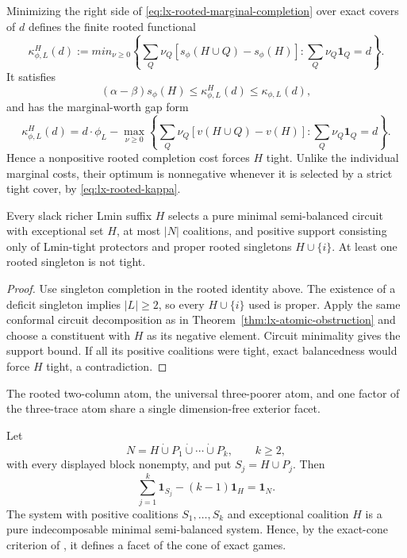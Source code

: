 Minimizing the right side of
\eqref{eq:lx-rooted-marginal-completion} over exact covers of $d$ defines the
finite rooted functional
\[
 \kappa^H_{\phi,L}(d):=min_{\nu\geq0}
 \left\{\sum_Q\nu_Q[s_\phi(H\cup Q)-s_\phi(H)]:
              \sum_Q\nu_Q\mathbf1_Q=d\right\}.
\]
It satisfies
\[
 (\alpha-\beta)s_\phi(H)\leq\kappa^H_{\phi,L}(d)
 \leq\kappa_{\phi,L}(d),                            \tag{RK}
 \label{eq:lx-rooted-kappa}
\]
and has the marginal-worth gap form
\[
 \kappa^H_{\phi,L}(d)=d\mathbin{\cdot}\phi_L-
 \max_{\nu\geq0}\left\{
   \sum_Q\nu_Q[v(H\cup Q)-v(H)]:
   \sum_Q\nu_Q\mathbf1_Q=d\right\}.               \tag{RG}
 \label{eq:lx-rooted-gap}
\]
Hence a nonpositive rooted completion cost forces $H$ tight.  Unlike the
individual marginal costs, their optimum is nonnegative whenever it is
selected by a strict tight cover, by \eqref{eq:lx-rooted-kappa}.

\begin{corollary}
\label{cor:lx-rooted-atomic-reduction}
Every slack richer Lmin suffix $H$ selects a pure minimal semi-balanced
circuit with exceptional set $H$, at most $|N|$ coalitions, and positive
support consisting only of Lmin-tight protectors and proper rooted
singletons $H\cup\{i\}$.  At least one rooted singleton is not tight.
\end{corollary}

\begin{proof}
Use singleton completion in the rooted identity above.  The existence of a
deficit singleton implies $|L|\geq2$, so every $H\cup\{i\}$ used is proper.
Apply the same conformal circuit decomposition as in
Theorem~\ref{thm:lx-atomic-obstruction} and choose a constituent with $H$ as
its negative element.  Circuit minimality gives the support bound.  If all
its positive coalitions were tight, exact balancedness would force $H$
tight, a contradiction.
\end{proof}

The rooted two-column atom, the universal three-poorer atom, and one factor
of the three-trace atom share a single dimension-free exterior facet.

\begin{theorem}
\label{thm:lx-block-star-facet}
Let
\[
 N=H\mathbin{\dot\cup}P_1\mathbin{\dot\cup}\cdots
       \mathbin{\dot\cup}P_k,\qquad k\geq2,
\]
with every displayed block nonempty, and put $S_j=H\cup P_j$.  Then
\[
 \sum_{j=1}^k\mathbf1_{S_j}-(k-1)\mathbf1_H=\mathbf1_N.       \tag{BS}
 \label{eq:lx-block-star-facet}
\]
The system with positive coalitions $S_1,\ldots,S_k$ and exceptional
coalition $H$ is a pure indecomposable minimal semi-balanced system.  Hence,
by the exact-cone criterion of \citet{StudenyKratochvil2022}, it defines a
facet of the cone of exact games.
\end{theorem}

